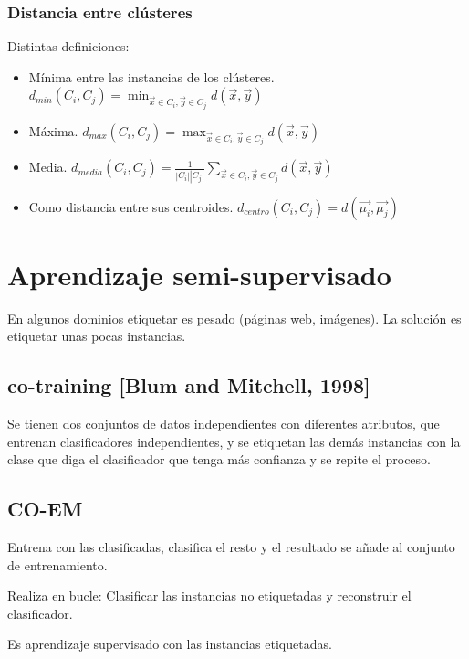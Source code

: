 \documentclass[12pt, twoside, openright]{report} %
\begin{document}
\pagebreak

\subsubsection{Distancia entre clústeres}

Distintas definiciones:
\begin{itemize}
  \item Mínima entre las instancias de los clústeres. $d_{min}(C_i, C_j) = \min_{\vec{x} \in C_i, \vec{y} \in C_j} d(\vec{x}, \vec{y})$
  \item Máxima. $d_{max}(C_i, C_j) = \max_{\vec{x} \in C_i, \vec{y} \in C_j} d(\vec{x}, \vec{y})$
  \item Media. $d_{media}(C_i, C_j) = \frac{1}{|C_i||C_j|} \sum_{\vec{x} \in C_i, \vec{y} \in C_j} d(\vec{x}, \vec{y})$
  \item Como distancia entre sus centroides. $d_{centro}(C_i, C_j) = d(\vec{\mu_i}, \vec{\mu_j})$
\end{itemize}

\section{Aprendizaje semi-supervisado}

En algunos dominios etiquetar es pesado (páginas web, imágenes). La solución es etiquetar unas pocas instancias.

\subsection{co-training [Blum and Mitchell, 1998]}

Se tienen dos conjuntos de datos independientes con diferentes atributos, que entrenan clasificadores independientes, y se etiquetan las demás instancias con la clase que diga el clasificador que tenga más confianza y se repite el proceso.

\subsection{CO-EM}

Entrena con las clasificadas, clasifica el resto y el resultado se añade al conjunto de entrenamiento.

Realiza en bucle: Clasificar las instancias no etiquetadas y reconstruir el clasificador.

Es aprendizaje supervisado con las instancias etiquetadas.
\end{document}
